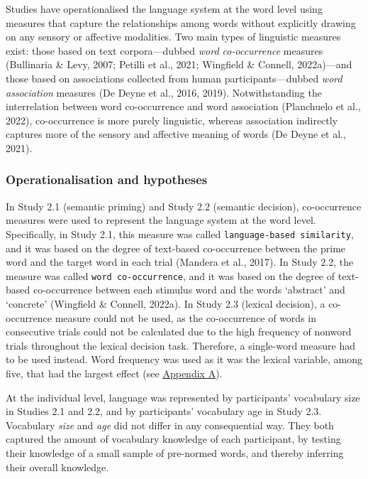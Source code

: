 \documentclass[
  12pt,
  man,floatsintext]{apa7}
\begin{document}
Studies have operationalised the language system at the word level using measures that capture the relationships among words without explicitly drawing on any sensory or affective modalities. Two main types of linguistic measures exist: those based on text corpora---dubbed \emph{word co-occurrence} measures (Bullinaria \& Levy, 2007; Petilli et al., 2021; Wingfield \& Connell, 2022a)---and those based on associations collected from human participants---dubbed \emph{word association} measures (De Deyne et al., 2016, 2019). Notwithstanding the interrelation between word co-occurrence and word association (Planchuelo et al., 2022), co-occurrence is more purely linguistic, whereas association indirectly captures more of the sensory and affective meaning of words (De Deyne et al., 2021).

\hypertarget{operationalisation-and-hypotheses}{%
\subsubsection{Operationalisation and hypotheses}\label{operationalisation-and-hypotheses}}

In Study 2.1 (semantic priming) and Study 2.2 (semantic decision), co-occurrence measures were used to represent the language system at the word level. Specifically, in Study 2.1, this measure was called \texttt{language-based\ similarity}, and it was based on the degree of text-based co-occurrence between the prime word and the target word in each trial (Mandera et al., 2017). In Study 2.2, the measure was called \texttt{word\ co-occurrence}, and it was based on the degree of text-based co-occurrence between each stimulus word and the words `abstract' and `concrete' (Wingfield \& Connell, 2022a). In Study 2.3 (lexical decision), a co-occurrence measure could not be used, as the co-occurrence of words in consecutive trials could not be calculated due to the high frequency of nonword trials throughout the lexical decision task. Therefore, a single-word measure had to be used instead. Word frequency was used as it was the lexical variable, among five, that had the largest effect (see \protect\hyperlink{appendix-A-lexical-covariates}{\underline{Appendix A}}).

At the individual level, language was represented by participants' vocabulary size in Studies 2.1 and 2.2, and by participants' vocabulary age in Study 2.3. Vocabulary \emph{size} and \emph{age} did not differ in any consequential way. They both captured the amount of vocabulary knowledge of each participant, by testing their knowledge of a small sample of pre-normed words, and thereby inferring their overall knowledge.
\end{document}
